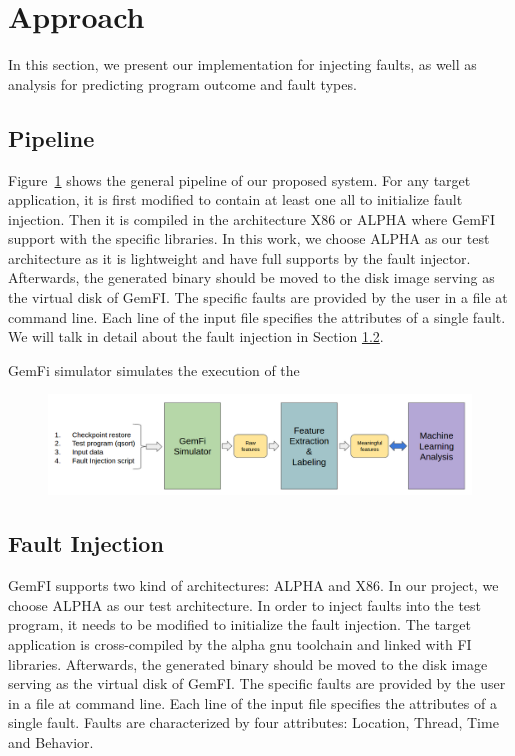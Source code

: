 \section{Approach}
In this section, we present our implementation for injecting faults, as well as analysis for predicting program outcome and fault types.

\subsection{Pipeline}
Figure~\ref{fig:pipeline} shows the general pipeline of our proposed system. For any target application, it is first modified to contain at least one all to initialize fault injection. Then it is compiled in the architecture X86 or ALPHA where GemFI support with the specific libraries. In this work, we choose ALPHA as our test architecture as it is lightweight and have full supports by the fault injector. Afterwards, the generated binary should be moved to the disk image serving as the virtual disk of GemFI. The specific faults are provided by the user in a file at command line. Each line of the input file specifies the attributes of a single fault. We will talk in detail about the fault injection in Section \ref{section:FI}. 

GemFi simulator simulates the execution of the 

\begin{figure}[t]
\begin{center}
   \includegraphics[width=0.95\linewidth]{./figures/pipeline.png}
\end{center}
   \caption{}
\label{fig:pipeline}
\end{figure}



\subsection{Fault Injection}\label{section:FI}
GemFI \cite{parasyris2014gemfi} supports two kind of architectures: ALPHA and X86. In our project, we choose ALPHA as our test architecture. In order to inject faults into the test program, it needs to be modified to initialize the fault injection. The target application is cross-compiled by the alpha gnu toolchain and linked with FI libraries. Afterwards, the generated binary should be moved to the disk image serving as the virtual disk of GemFI. The specific faults are provided by the user in a file at command line. Each line of the input file specifies the attributes of a single fault. Faults are characterized by four attributes: Location, Thread, Time and Behavior. 


